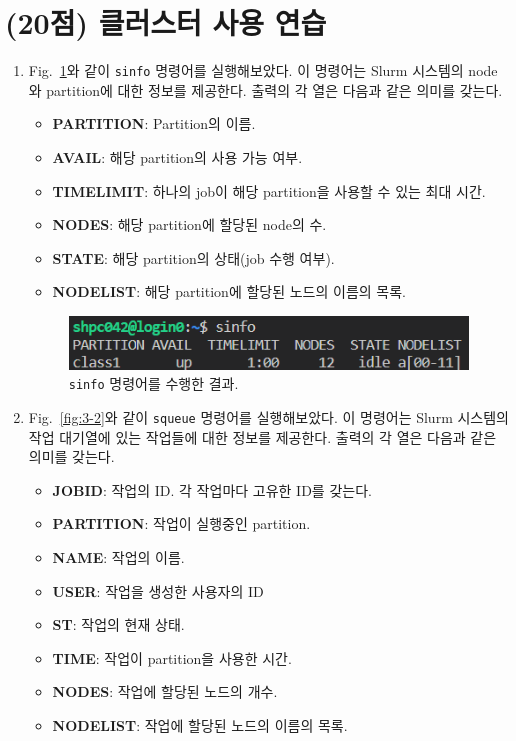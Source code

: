 \section{(20점) 클러스터 사용 연습}

\begin{enumerate}[label= (\alph*)]
    \item {
        Fig.~\ref{fig:3-1}와 같이 \texttt{sinfo} 명령어를 실행해보았다.
        이 명령어는 Slurm 시스템의 node와 partition에 대한 정보를 제공한다.
        출력의 각 열은 다음과 같은 의미를 갖는다.

        \begin{itemize}
            \item \textbf{PARTITION}: Partition의 이름.
            \item \textbf{AVAIL}: 해당 partition의 사용 가능 여부.
            \item \textbf{TIMELIMIT}: 하나의 job이 해당 partition을 사용할 수 있는 최대 시간.
            \item \textbf{NODES}: 해당 partition에 할당된 node의 수.
            \item \textbf{STATE}: 해당 partition의 상태(job 수행 여부).
            \item \textbf{NODELIST}: 해당 partition에 할당된 노드의 이름의 목록.
        \end{itemize}


        \begin{figure}[t]
            \centering
            \includegraphics[scale=1]{imgs/Figure06_sinfo_trial.png}
            \caption{\label{fig:3-1}
                \texttt{sinfo} 명령어를 수행한 결과.
            }
        \end{figure}
    }

    \item {
        Fig.~\ref{fig:3-2}와 같이 \texttt{squeue} 명령어를 실행해보았다.
        이 명령어는 Slurm 시스템의 작업 대기열에 있는 작업들에 대한 정보를 제공한다.
        출력의 각 열은 다음과 같은 의미를 갖는다.

        \begin{itemize}
            \item \textbf{JOBID}: 작업의 ID. 각 작업마다 고유한 ID를 갖는다.
            \item \textbf{PARTITION}: 작업이 실행중인 partition.
            \item \textbf{NAME}: 작업의 이름.
            \item \textbf{USER}: 작업을 생성한 사용자의 ID
            \item \textbf{ST}: 작업의 현재 상태.
            \item \textbf{TIME}: 작업이 partition을 사용한 시간.
            \item \textbf{NODES}: 작업에 할당된 노드의 개수.
            \item \textbf{NODELIST}: 작업에 할당된 노드의 이름의 목록.
        \end{itemize}


}
\end{enumerate}

